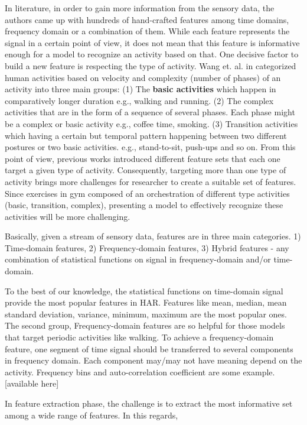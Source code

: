 \documentclass[journal,article,submit,moreauthors,pdftex]{Definitions/mdpi}
\begin{document}
In literature, in order to gain more information from the sensory data, the authors came up with hundreds of hand-crafted features among time domains, frequency domain or a combination of them. While each feature represents the signal in a certain point of view, it does not mean that this feature is informative enough for a model to recognize an activity based on that. One decisive factor to build a new feature is respecting the type of activity. Wang et. al. in \cite{wang2019survey} categorized human activities based on velocity and complexity (number of phases) of an activity into three main groups: (1) The \textbf{basic activities} which happen in comparatively longer duration e.g., walking and running. (2)  The complex activities that are in the form of a sequence of several phases. Each phase might be a complex or basic activity e.g., coffee time, smoking. (3) Transition activities which having a certain but temporal pattern happening between two different postures or two basic activities. e.g., stand-to-sit, push-ups and so on. From this point of view, previous works introduced  different feature sets that each one target a given type of activity. Consequently, targeting more than one type of activity brings more challenges for researcher to create a suitable set of features. Since exercises in gym composed of an orchestration of different type activities (basic, transition, complex), presenting a model to effectively recognize these activities will be more challenging.

Basically, given a stream of sensory data, features are in three main categories.\cite{wang2019survey} 1) Time-domain features, 2) Frequency-domain features, 3) Hybrid features - any combination of statistical functions on signal in frequency-domain and/or time-domain. 

To the best of our knowledge, the statistical functions on time-domain signal provide the most popular features in HAR. Features like mean, median, mean standard deviation, variance, minimum, maximum are the most popular ones. The second group, Frequency-domain features are so helpful for those models that target periodic activities like walking. To achieve a frequency-domain feature, one segment of time signal should be transferred to several components in frequency domain. Each component may/may not have meaning depend on the activity. Frequency bins and auto-correlation coefficient are some example.[available here]

In feature extraction phase, the challenge is to extract the most informative set among a wide range of features\cite{krishnan2009recognition}.  In this regards,
\end{document}
